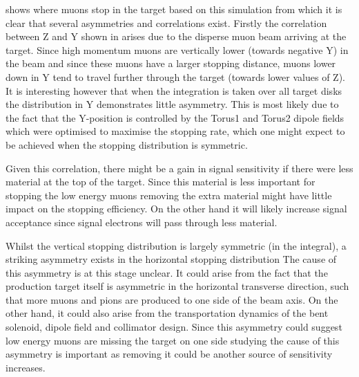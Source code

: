  shows where muons stop in the target based on this simulation from which it is clear that several asymmetries and correlations exist.
Firstly the correlation between Z and Y shown in  arises due to the disperse muon beam arriving at the target. 
Since high momentum muons are vertically lower (towards negative Y) in the beam and since these muons have a larger stopping distance, muons lower down in Y tend to travel further through the target (towards lower values of Z).
It is interesting however that when the integration is taken over all target disks the distribution in Y demonstrates little asymmetry. 
This is most likely due to the fact that the Y-position is controlled by the Torus1 and Torus2 dipole fields which were optimised to maximise the stopping rate, which one might expect to be achieved when the stopping distribution is symmetric.

\FigSensMuStopsTwoD
Given this correlation, there might be a gain in signal sensitivity if there were less material at the top of the target.
Since this material is less important for stopping the low energy muons removing the extra material might have little impact on the stopping efficiency.
On the other hand it will likely increase signal acceptance since signal electrons will pass through less material.

Whilst the vertical stopping distribution is largely symmetric (in the integral),
a striking asymmetry exists in the horizontal stopping distribution
The cause of this asymmetry is at this stage unclear.
It could arise from the fact that the production target itself is asymmetric in the horizontal transverse direction, such that more muons and pions are produced to one side of the beam axis.
On the other hand, it could also arise from the transportation dynamics of the bent solenoid, dipole field and collimator design. 
Since this asymmetry could suggest low energy muons are missing the target on one side studying the cause of this asymmetry is important as removing it could be another source of sensitivity increases.


